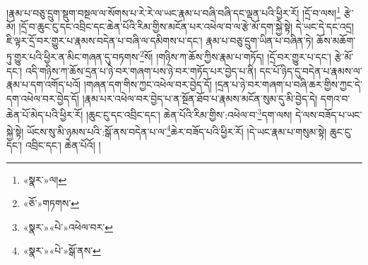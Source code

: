 །རྣམ་པ་བཅུ་དྲུག་སྡུག་བསྔལ་ལ་སོགས་པ་རེ་རེ་ལ་ཡང་རྣམ་པ་བཞི་བཞི་དང་ལྡན་པའི་ཕྱིར་རོ། །དྲོ་བ་ལས།\footnote{«སྣར་»ལ།} རྩེ་མོ། །དྲོ་བ་ཆུང་ངུ་དང་འབྲིང་དང་ཆེན་པོའི་རིམ་གྱིས་མངོན་པར་འཕེལ་བ་ལ་རྩེ་མོ་དག་སྐྱེ་སྟེ། དེ་ཡང་དེ་དང་འདྲ། ཇི་ལྟར་དྲོ་བར་གྱུར་པ་རྣམས་བདེན་པ་བཞི་ལ་དམིགས་པ་དང་། རྣམ་པ་བཅུ་དྲུག་ཡིན་པ་བཞིན་ཏེ། ཆོས་མཆོག་ཏུ་གྱུར་པའི་ཕྱིར་ན་མིང་གཞན་དུ་བཏགས་\footnote{«ཅོ་»གཏགས་}སོ། །གཉིས་ཀ་ཆོས་ཀྱིས་རྣམ་པ་གཏོད། །དྲོ་བར་གྱུར་པ་དང་། རྩེ་མོ་དང་། འདི་གཉིས་ཀ་ཆོས་དྲན་པ་ཉེ་བར་གཞག་པས་ཉེ་བར་གཏོད་པར་བྱེད་པ་ནི། དང་པོ་ཉིད་དུ་བདེན་པ་རྣམས་ལ་རྣམ་པ་དག་འགོད་པའོ། །གཞན་དག་གིས་ཀྱང་འཕེལ་བར་བྱེད་དོ། །དྲན་པ་ཉེ་བར་གཞག་པ་བཞི་ཆར་གྱིས་ཀྱང་དེ་དག་འཕེལ་བར་བྱེད་དོ། །རྣམ་པར་འཕེལ་བར་བྱེད་པ་ན་སྔོན་ཐོབ་པ་རྣམས་མངོན་སུམ་དུ་མི་བྱེད་དེ། དགའ་བ་ཆེན་པོ་མེད་པའི་ཕྱིར་རོ། །ཆུང་ངུ་དང་འབྲིང་དང་། ཆེན་པོའི་རིམ་གྱིས་:འཕེལ་བ་\footnote{«སྣར་»«པེ་»འཕེལ་བར་}དག་ལས། དེ་ལས་བཟོད་པ་ཡང་སྐྱེ་སྟེ། ཡོངས་སུ་མི་ཉམས་པའི་:སྒོ་ནས་བདེན་པ་ལ་\footnote{«སྣར་»«པེ་»སྒོ་ནས་}ཆེར་བཟོད་པའི་ཕྱིར་རོ། །དེ་ཡང་རྣམ་པ་གསུམ་སྟེ། ཆུང་ངུ་དང་། འབྲིང་དང་། ཆེན་པོའོ། །
